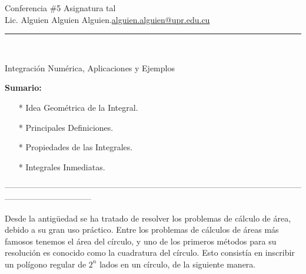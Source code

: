 \documentclass{article}
\begin{document}
{{\huge\color{uprgreen} Conferencia $\#$5}\hfill{\color{uprgreen} Asignatura tal}}\\
{\color{uprgreen} Lic. Alguien Alguien Alguien.\hfill \href{mailto:alguien.alguien@upr.edu.cu}{alguien.alguien@upr.edu.cu}}
{\color{uprgreen} \hrule}
\text{\ \ }
\\
\begin{center}
	\Large\color{uprgreen} Integración Numérica, Aplicaciones y Ejemplos
\end{center}
{\Large\bf\color{uprgreen} Sumario:}
\begin{itemize}
	\item[\color{uprgreen}*] Idea Geométrica de la Integral.
	\item[\color{uprgreen}*] Principales Definiciones.
	\item[\color{uprgreen}*] Propiedades de las Integrales.
	\item[\color{uprgreen}*] Integrales Inmediatas.
\end{itemize}
\begin{center}
	{\color{uprgreen}--------------------------------------------------------------------------------------------------------------------------------------------}
\end{center}

Desde la antigüedad se ha tratado de resolver los problemas de cálculo de área, debido a su gran uso práctico. Entre los problemas de cálculos de áreas más famosos tenemos el área del círculo, y uno de los primeros métodos para su resolución es conocido como la cuadratura del círculo. Esto consistía en inscribir un polígono regular de $2^n$ lados en un círculo, de la siguiente manera.
\end{document}
